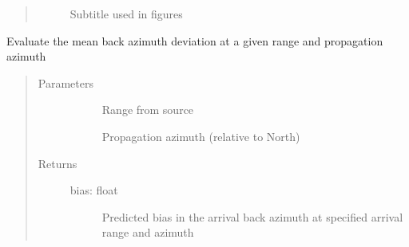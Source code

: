 \documentclass[letterpaper,10pt,english]{sphinxmanual}
\begin{document}
\begin{fulllineitems}
\begin{fulllineitems}
\begin{quote}
\begin{description}
\begin{description}
\item[{}] \leavevmode
Subtitle used in figures

\end{description}

\end{description}\end{quote}

\end{fulllineitems}


\begin{fulllineitems}
\label{\detokenize{stochprop.propagation:stochprop.propagation.PathGeometryModel.eval_az_dev_mn}}
Evaluate the mean back azimuth deviation at a given range
and propagation azimuth
\begin{quote}\begin{description}
\item[{Parameters}] \leavevmode\begin{description}
\item[{}] \leavevmode
Range from source

\item[{}] \leavevmode
Propagation azimuth (relative to North)

\end{description}

\item[{Returns}] \leavevmode\begin{description}
\item[{bias: float}] \leavevmode
Predicted bias in the arrival back azimuth at specified arrival range and azimuth

\end{description}

\end{description}\end{quote}

\end{fulllineitems}



\end{fulllineitems}
\end{document}
